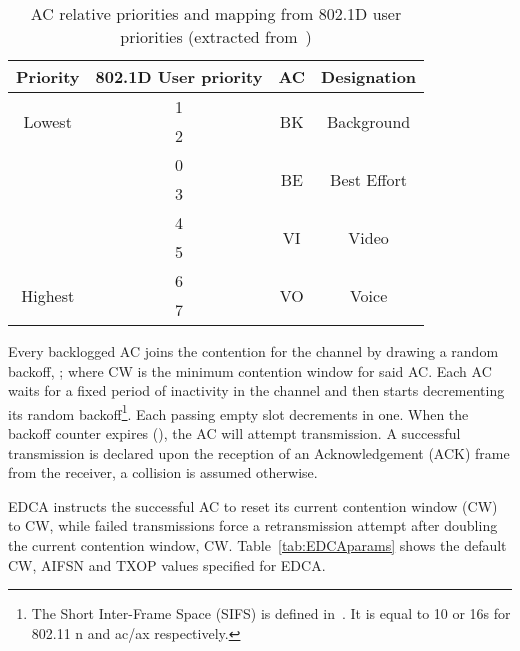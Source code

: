 \documentclass[a4paper]{article}
\begin{document}
	\begin{table}[t]
		\centering
		\caption{AC relative priorities and mapping from 802.1D user priorities (extracted from~\cite{perahia2013next})}
		\label{tab:prioritiesMap}
		\begin{tabular}{|c|c|c|c|}
			\hline
			{\bfseries Priority} & {\bfseries 802.1D User priority} & {\bfseries AC} & {\bfseries Designation}\\
			\hline
			\multirow{2}{*}{Lowest} & 1 & \multirow{2}{*}{BK} & \multirow{2}{*}{Background}\\
			\cline{2-2}
							     & 2 &				    &\\
			\hline
			\multirow{2}{*}{}	     & 0 & \multirow{2}{*}{BE} & \multirow{2}{*}{Best Effort}\\
			\cline{2-2}
							     & 3 & 				     &\\
			\hline
			\multirow{2}{*}{}	     & 4 & \multirow{2}{*}{VI} & \multirow{2}{*}{Video}\\
			\cline{2-2}
							     & 5 & 				     &\\
			\hline
			\multirow{2}{*}{Highest}& 6 & \multirow{2}{*}{VO} & \multirow{2}{*}{Voice}\\
			\cline{2-2}
							     & 7 & 				     &\\
			\hline			
		\end{tabular}
	\end{table}
	
Every backlogged AC joins the contention for the channel by drawing a random backoff, ; where CW is the minimum contention window for said AC. Each AC waits for a fixed  period of inactivity in the channel and then starts decrementing its random backoff\footnote{The Short Inter-Frame Space (SIFS) is defined in~\cite{802Standards}. It is equal to 10 or 16s for 802.11 n and ac/ax respectively.}. Each passing empty slot decrements  in one. When the backoff counter expires (), the AC will attempt transmission. A successful transmission is declared upon the reception of an Acknowledgement (ACK) frame from the receiver, a collision is assumed otherwise. 

EDCA instructs the successful AC to reset its current contention window (CW) to CW, while failed transmissions force a retransmission attempt after doubling the current contention window, CW. Table~\ref{tab:EDCAparams} shows the default CW, AIFSN and TXOP values specified for EDCA. 
\end{document}
